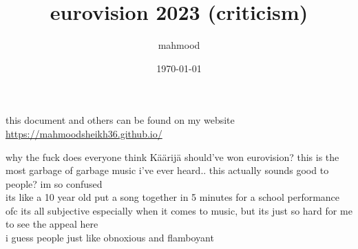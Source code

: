 \documentclass[a4paper,12pt]{article}
\author{mahmood}
\date{\today}
\title{eurovision 2023 (criticism)}
\begin{document}
\maketitle
\begin{note}
this document and others can be found on my website\\
\url{https://mahmoodsheikh36.github.io/}
\end{note}
why the fuck does everyone think Käärijä should've won eurovision? this is the most garbage of garbage music i've ever heard.. this actually sounds good to people? im so confused\\
its like a 10 year old put a song together in 5 minutes for a school performance\\
ofc its all subjective especially when it comes to music, but its just so hard for me to see the appeal here\\
i guess people just like obnoxious and flamboyant
\end{document}
